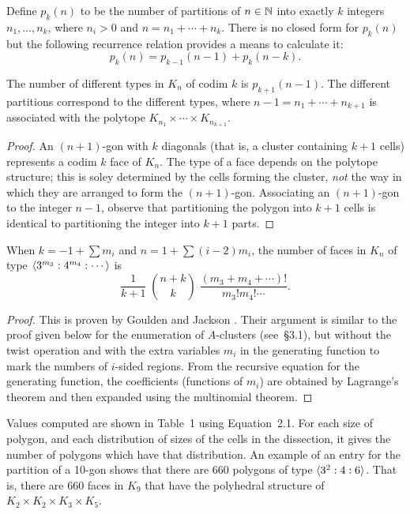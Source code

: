 \documentclass[10pt]{amsart}
\begin{document}
Define $p_k(n)$ to be the number of partitions of $n \in {\mathbb N}$ into exactly $k$ integers $n_1, \ldots, n_k$, where $n_i > 0$ and $n = n_1 + \cdots + n_k$.  There is no closed form for $p_k(n)$ but the following recurrence relation provides a means to calculate it:
\begin{equation}
p_k(n) = p_{k-1}(n-1) + p_k(n-k).
\label{e:part}
\end{equation}

\begin{thm} 
The number of different types in $K_n$ of codim $k$ is $p_{k+1}(n-1)$. The different partitions correspond to the different types, where $n-1 = n_1 + \cdots + n_{k+1}$ is associated with the polytope $K_{n_1} \times \cdots \times K_{n_{k+1}}$.
\end{thm}

\begin{proof}
An $(n+1)$-gon with $k$ diagonals (that is, a cluster containing $k+1$ cells) represents a codim $k$ face of $K_n$. The type of a face depends on the polytope structure; this is soley determined by the cells forming the cluster, {\em not} the way in which they are arranged to form the $(n+1)$-gon. Associating an $(n+1)$-gon to the integer $n-1$, observe that partitioning the polygon into $k+1$ cells is identical to partitioning the integer into $k+1$ parts.
\end{proof}

\begin{thm} [Solution to {\em P3}\,]
When $k = -1 + \sum m_i$ and $n = 1 + \sum (i-2)m_i$, the number of faces in $K_n$ of type ${\langle} 3^{m_3} : 4^{m_4} : \cdots {\rangle}$ is 
$$\frac{1}{k+1} \; \binom{n+k}{k} \; \frac{(m_3 + m_4 + \cdots)!}{m_3!   m_4!   \cdots}.$$
\end{thm}

\begin{proof}
This is proven by Goulden and Jackson \cite[Exercise 2.7.14]{gj}. Their argument is similar to the proof given below for the enumeration of $A$-clusters (see~\S3.1), but without the twist operation and with the extra variables $m_i$ in the generating function to mark the numbers of $i$-sided regions. From the recursive equation for the generating function, the coefficients (functions of $m_i$) are obtained by Lagrange's theorem and then expanded using the multinomial theorem.
\end{proof}

Values computed are shown in Table~1 using Equation~2.1.  For each size of polygon, and each distribution of sizes of the cells in the dissection, it gives the number of polygons which have that distribution.  An example of an entry for the partition of a 10-gon shows that there are 660 polygons of type ${\langle} 3^2:4:6 {\rangle}$.  That is, there are 660 faces in $K_9$ that have the polyhedral structure of $K_2 \times K_2 \times K_3 \times K_5$.
\end{document}
